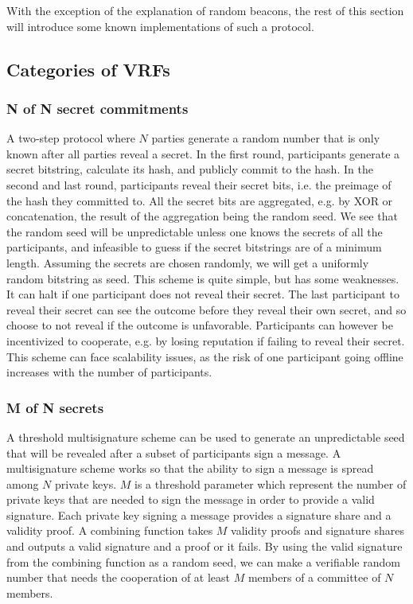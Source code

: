 With the exception of the explanation of random beacons, the rest of this section will introduce some known implementations of such a protocol.

\subsection{Categories of VRFs}

\subsubsection{N of N  secret commitments}
A two-step protocol where $N$ parties generate a random number that is only known after all parties reveal a secret.
In the first round, participants generate a secret bitstring, calculate its hash, and publicly commit to the hash. In the second and last round, participants reveal their secret bits, i.e. the preimage of the hash they committed to. All the secret bits are aggregated, e.g. by XOR or concatenation, the result of the aggregation being the random seed. We see that the random seed will be unpredictable unless one knows the secrets of all the participants, and infeasible to guess if the secret bitstrings are of a minimum length. Assuming the secrets are chosen randomly, we will get a uniformly random bitstring as seed.
This scheme is quite simple, but has some weaknesses. It can halt if one participant does not reveal their secret. The last participant to reveal their secret can see the outcome before they reveal their own secret, and so choose to not reveal if the outcome is unfavorable. Participants can however be incentivized to cooperate, e.g. by losing reputation if failing to reveal their secret. This scheme can face scalability issues, as the risk of one participant going offline increases with the number of participants.

\subsubsection{M of N secrets}
A threshold multisignature scheme can be used to generate an unpredictable seed that will be revealed after a subset of participants sign a message.
A multisignature scheme works so that the ability to sign a message is spread among $N$ private keys. $M$ is a threshold parameter which represent the number of private keys that are needed to sign the message in order to provide a valid signature. Each private key signing a message provides a signature share and a validity proof. A combining function takes $M$ validity proofs and signature shares and outputs a valid signature and a proof or it fails. By using the valid signature from the combining function as a random seed, we can make a verifiable random number that needs the cooperation of at least $M$ members of a committee of $N$ members.  

